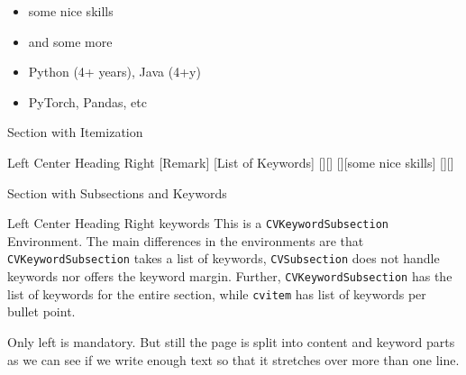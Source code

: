 \documentclass[a4paper]{mcdowellcv}
\begin{document}
	
    \makeheader

    \begin{cvsection}{}
    \begin{multicols}{2}
        \begin{itemize}
            \item some nice skills
            \item and some more 
            \item Python (4+ years), Java (4+y)
            \item PyTorch, Pandas, etc
        \end{itemize}
    \end{multicols}
        
    \end{cvsection}
    
    \begin{cvsection}{Section with Itemization}
        \begin{cvitemize}
            {Left}
            {Center Heading}
            {Right}
                    [Remark]
                    [List of Keywords]
                [][]
                [][some nice skills]
                [][]
        \end{cvitemize}
    \end{cvsection}

    \begin{cvsection}{Section with Subsections and Keywords}
        \begin{cvkeywordsubsection}
            {Left}
            {Center Heading}
            {Right}
            {keywords}
                 This is a \texttt{CVKeywordSubsection} Environment. 
                 The main differences in the environments are that \texttt{CVKeywordSubsection} takes a list of keywords, \texttt{CVSubsection} does not handle keywords nor offers the keyword margin.
                 Further, \texttt{CVKeywordSubsection} has the list of keywords for the entire section, while \texttt{cvitem} has list of keywords per bullet point.
        \end{cvkeywordsubsection}
        \begin{cvkeywordsubsection}
            {Only left is mandatory.}
            {}
            {}
            {}
            But still the page is split into content and keyword parts as we can see if we write enough text so that it stretches over more than one line. 
        \end{cvkeywordsubsection}
    \end{cvsection}
\end{document}
